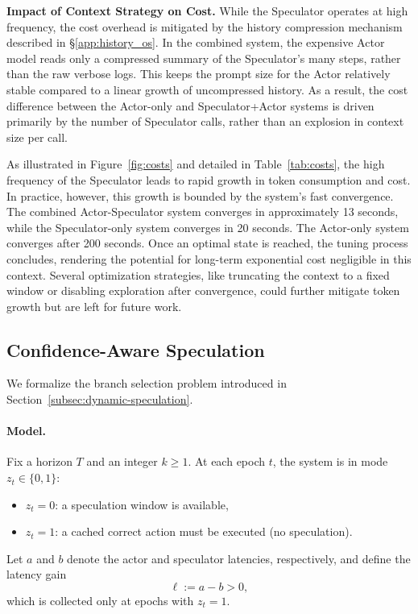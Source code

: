 \noindent \textbf{Impact of Context Strategy on Cost.} 
While the Speculator operates at high frequency, the cost overhead is mitigated by the history compression mechanism described in \S\ref{app:history_os}. 
In the combined system, the expensive Actor model reads only a compressed summary of the Speculator's many steps, rather than the raw verbose logs. 
This keeps the prompt size for the Actor relatively stable compared to a linear growth of uncompressed history. 
As a result, the cost difference between the Actor-only and Speculator+Actor systems is driven primarily by the number of Speculator calls, rather than an explosion in context size per call.

As illustrated in Figure~\ref{fig:costs} and detailed in Table~\ref{tab:costs}, the high frequency of the Speculator leads to rapid growth in token consumption and cost. 
In practice, however, this growth is bounded by the system's fast convergence. 
The combined Actor-Speculator system converges in approximately 13 seconds, while the Speculator-only system converges in 20 seconds. The Actor-only system converges after 200 seconds. 
Once an optimal state is reached, the tuning process concludes, rendering the potential for long-term exponential cost negligible in this context. Several optimization strategies, like truncating the context to a fixed window or disabling exploration after convergence, could further mitigate token growth but are left for future work.

\subsection{Confidence-Aware Speculation}

We formalize the branch selection problem introduced in
Section~\ref{subsec:dynamic-speculation}.

\paragraph{Model.}
Fix a horizon $T$ and an integer $k \ge 1$.
At each epoch $t$, the system is in mode $z_t \in \{0,1\}$:
\begin{itemize}
    \item $z_t = 0$: a speculation window is available,
    \item $z_t = 1$: a cached correct action must be executed (no speculation).
\end{itemize}

Let $a$ and $b$ denote the actor and speculator latencies, respectively, and define the latency gain
\[
\ell := a - b > 0,
\]
which is collected only at epochs with $z_t = 1$.


